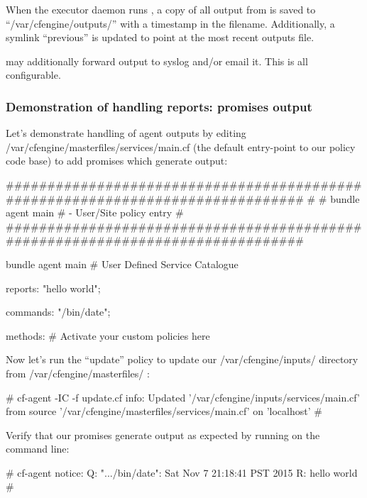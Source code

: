 When the executor daemon  runs , a copy of all output
from  is saved to ``/var/cfengine/outputs/'' with a timestamp in
the filename. Additionally, a symlink ``previous'' is updated to point at
the most recent outputs file.

 may additionally forward output to syslog and/or email it.
This is all configurable.





\subsubsection{Demonstration of handling reports: promises output}

Let's demonstrate handling of agent outputs by editing
/var/cfengine/masterfiles/services/main.cf (the default
entry-point to our policy code base) to add promises which generate
output:

\begin{code}
###############################################################################
#
# bundle agent main
#  - User/Site policy entry
#
###############################################################################

bundle agent main
# User Defined Service Catalogue
{
  reports:
    "hello world";

  commands:
    "/bin/date";

  methods:
    # Activate your custom policies here
}
\end{code}





Now let's run the ``update'' policy to update our /var/cfengine/inputs/
directory from /var/cfengine/masterfiles/ :

\begin{code}
# cf-agent -IC -f update.cf
    info: Updated '/var/cfengine/inputs/services/main.cf' from source
'/var/cfengine/masterfiles/services/main.cf' on 'localhost'
# 
\end{code}





Verify that our promises generate output as expected by running  on the command line:

\begin{code}
# cf-agent
  notice: Q: ".../bin/date": Sat Nov  7 21:18:41 PST 2015
R: hello world
#
\end{code}





